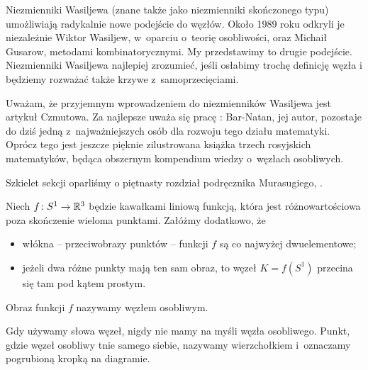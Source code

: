 Niezmienniki Wasiljewa (znane także jako niezmienniki skończonego typu) umożliwiają radykalnie nowe podejście do węzłów.
Około 1989 roku odkryli je niezależnie Wiktor Wasiljew, w~oparciu o~teorię osobliwości, oraz Michaił Gusarow, metodami kombinatorycznymi.
%
%
My przedstawimy to drugie podejście.
Niezmienniki Wasiljewa najlepiej zrozumieć, jeśli osłabimy trochę definicję węzła i będziemy rozważać także krzywe z~samoprzecięciami.

Uważam, że przyjemnym wprowadzeniem do niezmienników Wasiljewa jest artykuł \cite{chmutov12} Czmutowa.
%
Za najlepsze uważa się pracę \cite{barnatan_95}: Bar-Natan, jej autor, pozostaje do dziś jedną z~najważniejszych osób dla rozwoju tego działu matematyki.
%
Oprócz tego jest jeszcze pięknie zilustrowana książka \cite{duzhin12} trzech rosyjskich matematyków, będąca obszernym kompendium wiedzy o~węzłach osobliwych.
%
%

Szkielet sekcji oparliśmy o piętnasty rozdział podręcznika Murasugiego, \cite{murasugi96}.

\begin{definition}
%
    Niech $f \colon S^1 \to \mathbb R^3$ będzie kawałkami liniową funkcją, która jest różnowartościowa poza skończenie wieloma punktami.
    Załóżmy dodatkowo, że
    \begin{itemize}
        \item włókna -- przeciwobrazy punktów -- funkcji $f$ są co najwyżej dwuelementowe;
        \item jeżeli dwa różne punkty mają ten sam obraz, to węzeł $K = f(S^1)$ przecina się tam pod kątem prostym.
    \end{itemize}
    Obraz funkcji $f$ nazywamy węzłem osobliwym.
\end{definition}

Gdy używamy słowa węzeł, nigdy nie mamy na myśli węzła osobliwego.
Punkt, gdzie węzeł osobliwy tnie samego siebie, nazywamy wierzchołkiem i~oznaczamy pogrubioną kropką na diagramie.
%

